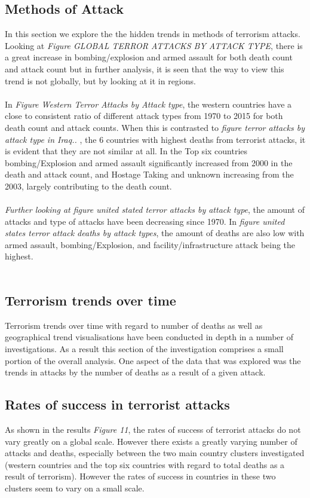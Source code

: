 \documentclass[10pt,a4paper]{article}
\begin{document}
\subsection{Methods of Attack}
In this section we explore the the hidden trends in methods of terrorism attacks. Looking at \textit{Figure GLOBAL TERROR ATTACKS BY ATTACK TYPE}, there is a great increase in bombing/explosion and armed assault for both death count and attack count but in further analysis, it is seen that the way to view this trend is not globally, but by looking at it in regions.
\\\\
In \textit{Figure Western Terror Attacks by Attack type}, the western countries have a close to consistent ratio of different attack types from 1970 to 2015 for both death count and attack counts. When this is contrasted to \textit{figure terror attacks by attack type in Iraq.. }, the 6 countries with highest deaths from terrorist attacks, it is evident that they are not similar at all. In the Top six countries bombing/Explosion and armed assault significantly increased from 2000 in the death and attack count, and Hostage Taking and unknown increasing from the 2003, largely contributing to the death count.
\\\\
\textit{Further looking at figure united stated terror attacks by attack type}, the amount of attacks and type of attacks have been decreasing since 1970. In \textit{figure united states terror attack deaths by attack types}, the amount of deaths are also low with armed assault, bombing/Explosion, and facility/infrastructure attack being the highest.
\\\

\subsection{Terrorism trends over time}

Terrorism trends over time with regard to number of deaths as well as geographical trend visualisations have been conducted in depth in a number of investigations. 
As a result this section of the investigation comprises a small portion of the overall analysis. 
One aspect of the data that was explored was the trends in attacks by the number of deaths as a result of a given attack.


\subsection{Rates of success in terrorist attacks}
As shown in the results \textit{Figure 11}, the rates of success of terrorist attacks do not vary greatly on a global scale. However there exists a greatly varying number of attacks and deaths, especially between the two main country clusters investigated (western countries and the top six countries with regard to total deaths as a result of terrorism).
However the rates of success in countries in these two clusters seem to vary on a small scale.
\end{document}
